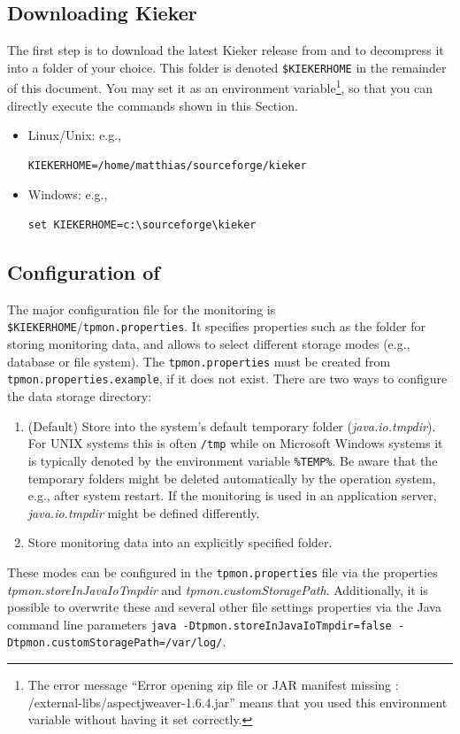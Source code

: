 \documentclass[a4paper,12pt]{scrartcl}
\begin{document}
\subsection{Downloading Kieker}
The first step is to download the latest Kieker release from \kiekerurl{} and to decompress it into a folder of your choice. This folder is denoted \texttt{\$KIEKERHOME} in the remainder of this document. You may set it as an environment variable\footnote{The error message ``Error opening zip file or JAR manifest missing : /external-libs/aspectjweaver-1.6.4.jar'' means that you used this environment variable without having it set correctly.}, so that you can directly execute the commands shown in this Section.
\begin{itemize}
 \item Linux/Unix: e.g., %
\begin{lstlisting}[caption={}]
KIEKERHOME=/home/matthias/sourceforge/kieker
\end{lstlisting}
\item Windows: e.g.,
\begin{lstlisting}[caption={}]
set KIEKERHOME=c:\sourceforge\kieker
\end{lstlisting}
\end{itemize}

\subsection{Configuration of \tpmon{}}
The major configuration file for the monitoring is \texttt{\$KIEKERHOME}/\texttt{tpmon.properties}. It specifies properties such as the folder for storing monitoring data, and allows to select different storage modes (e.g., database or file system). The \texttt{tpmon.properties} must be created from \texttt{tpmon.properties.example}, if it does not exist. There are two ways to configure the data storage directory:
\begin{enumerate}
\item (Default) Store into the system's default temporary folder (\textit{java.io.tmpdir}). For UNIX systems this is often \texttt{/tmp} while on Microsoft Windows systems it is typically %
denoted by the environment variable \texttt{\%TEMP\%}. Be aware that the temporary folders might be deleted automatically by the operation system, e.g., after system restart. If the monitoring is used in an application server, \textit{java.io.tmpdir} might be defined differently.
\item Store monitoring data into an explicitly specified folder.
\end{enumerate}
These modes can be configured in the \texttt{tpmon.properties} file via the properties \linebreak[4] \textit{tpmon.storeInJavaIoTmpdir} and \textit{tpmon.customStoragePath}. Additionally, it is possible to overwrite these and several other file settings properties via the Java command line parameters {\footnotesize \texttt{java -Dtpmon.storeInJavaIoTmpdir=false -Dtpmon.customStoragePath=/var/log/}}.
\end{document}
